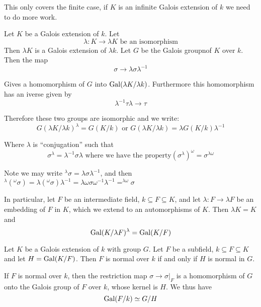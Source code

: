 \begin{remark}
    This only covers the finite case, if $K$ is an infinite Galois extension of $k$ we need to do more work.
\end{remark}

Let $K$ be a Galois extension of $k$. Let \[\lambda\colon K\rightarrow \lambda K \text{ be an isomorphism}\]
Then $\lambda K$ is a Galois extension of $\lambda k$. Let $G$ be the Galois groupnof $K$ over $k$. Then the map\[
        \sigma\rightarrow \lambda \sigma \lambda^{-1}    
\] 

Gives a homomorphism of $G$ into $\text{Gal}(\lambda K/\lambda k)$. Furthermore this homomorphism has an iverse given by \[\lambda^{-1}\tau\lambda\rightarrow \tau \]

Therefore these two groups are isomorphic and we write:\[
    {G(\lambda K/\lambda k)}^\lambda = G(K/k) \text{ or } {G(\lambda K/\lambda k)} = \lambda G(K/k) \lambda^{-1}
\]

Where $\lambda$ is ``conjugation'' such that\[
    \sigma^\lambda = \lambda^{-1}\sigma\lambda \text{ where we have the property} {(\sigma^\lambda)}^\omega = \sigma^{\lambda\omega}    
\]
\begin{bergman}
    Note we may write $^\lambda\sigma = \lambda\sigma\lambda^{-1}$, and then $^\lambda(^\omega \sigma) = \lambda(^\omega \sigma)\lambda^{-1} = \lambda\omega \sigma\omega^{-1}\lambda^{-1} = ^{\lambda\omega}\sigma$
\end{bergman}


In particular, let $F$ be an intermediate field, $k\subseteq F\subseteq K$, and let $\lambda\colon F\rightarrow \lambda F$ be an embedding of $F$ in $K$, which we extend to an automorphisms of $K$. Then $\lambda K = K$ and \[
        \text{Gal}(K/\lambda F)^\lambda = \text{Gal}(K/F)    
\]

\begin{theorem}\label{1.10}
    Let $K$ be a Galois extension of $k$ with group $G$. Let $F$ be a subfield, $k\subseteq F\subseteq K$ and let $H=\text{Gal}(K/F)$. Then $F$ is normal over $k$ if and only if $H$ is normal in $G$.

    If $F$ is normal over $k$, then the restriction map $\sigma\rightarrow \sigma|_F$ is a homomorphism of $G$ onto the Galois group of $F$ over $k$, whose kernel is $H$. We thus have \[
        \text{Gal}(F/k) \simeq G/H    
    \]
\end{theorem}


\printindex
